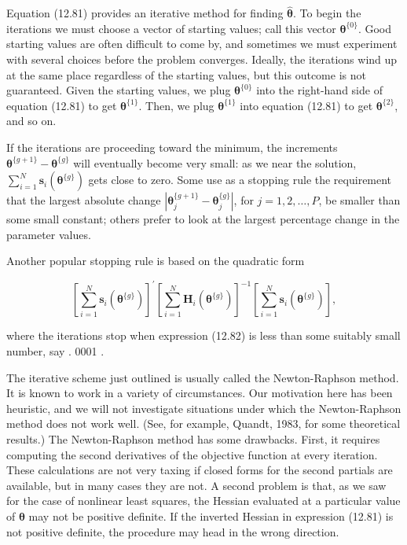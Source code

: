 \documentclass[10pt]{article}
\begin{document}
Equation (12.81) provides an iterative method for finding $\hat{\boldsymbol{\theta}}$. To begin the iterations we must choose a vector of starting values; call this vector $\boldsymbol{\theta}^{\{0\}}$. Good starting values are often difficult to come by, and sometimes we must experiment with several choices before the problem converges. Ideally, the iterations wind up at the same place regardless of the starting values, but this outcome is not guaranteed. Given the starting values, we plug $\boldsymbol{\theta}^{\{0\}}$ into the right-hand side of equation (12.81) to get $\boldsymbol{\theta}^{\{1\}}$. Then, we plug $\boldsymbol{\theta}^{\{1\}}$ into equation (12.81) to get $\boldsymbol{\theta}^{\{2\}}$, and so on.

If the iterations are proceeding toward the minimum, the increments $\boldsymbol{\theta}^{\{g+1\}}-\boldsymbol{\theta}^{\{g\}}$ will eventually become very small: as we near the solution, $\sum_{i=1}^{N} \mathbf{s}_{i}\left(\boldsymbol{\theta}^{\{g\}}\right)$ gets close to zero. Some use as a stopping rule the requirement that the largest absolute change $\left|\boldsymbol{\theta}_{j}^{\{g+1\}}-\boldsymbol{\theta}_{j}^{\{g\}}\right|$, for $j=1,2, \ldots, P$, be smaller than some small constant; others prefer to look at the largest percentage change in the parameter values.

Another popular stopping rule is based on the quadratic form


\begin{equation*}
\left[\sum_{i=1}^{N} \mathbf{s}_{i}\left(\boldsymbol{\theta}^{\{g\}}\right)\right]^{\prime}\left[\sum_{i=1}^{N} \mathbf{H}_{i}\left(\boldsymbol{\theta}^{\{g\}}\right)\right]^{-1}\left[\sum_{i=1}^{N} \mathbf{s}_{i}\left(\boldsymbol{\theta}^{\{g\}}\right)\right], \tag{12.82}
\end{equation*}


where the iterations stop when expression (12.82) is less than some suitably small number, say . 0001 .

The iterative scheme just outlined is usually called the Newton-Raphson method. It is known to work in a variety of circumstances. Our motivation here has been heuristic, and we will not investigate situations under which the Newton-Raphson method does not work well. (See, for example, Quandt, 1983, for some theoretical results.) The Newton-Raphson method has some drawbacks. First, it requires computing the second derivatives of the objective function at every iteration. These calculations are not very taxing if closed forms for the second partials are available, but in many cases they are not. A second problem is that, as we saw for the case of nonlinear least squares, the Hessian evaluated at a particular value of $\boldsymbol{\theta}$ may not be positive definite. If the inverted Hessian in expression (12.81) is not positive definite, the procedure may head in the wrong direction.
\end{document}
